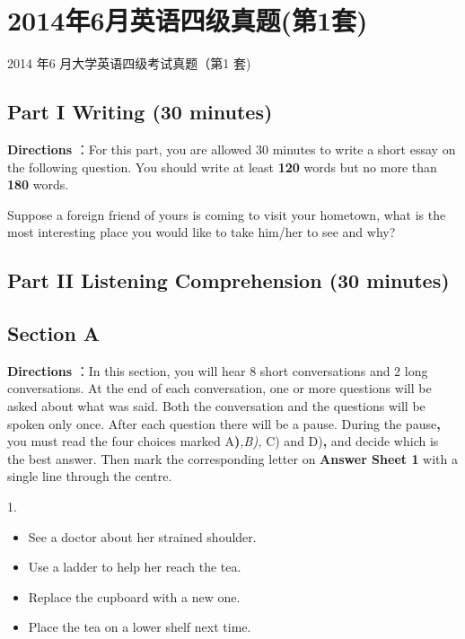 \documentclass[UTF8,11pt]{ctexart}
\begin{document}
\section*{2014年6月英语四级真题(第1套)}
2014 年6 月大学英语四级考试真题（第1 套)


\subsection*{\textbf{Part I} \textbf{Writing} \textbf{(30 minutes)}}


\textbf{Directions} ：For this part, you are allowed 30 minutes to write a short essay on the following question. You should write at least \textbf{120} words but no more than\textbf{ 180} words.


Suppose a foreign friend of yours is coming to visit your hometown, what is the most interesting place you would like to take him/her to see and why?


\subsection*{\textbf{Part II} \textbf{Listening Comprehension} \textbf{(30 minutes)}}


\subsection*{\textbf{Section A}}


\textbf{Directions} ：In this section, you will hear 8 short conversations and 2 long conversations. At the end of each conversation, one or more questions will be asked about what was said. Both the conversation and the questions will be spoken only once. After each question there will be a pause. During the pause\textbf{,} you must read the four choices marked A\textbf{)}\textit{,B),} C) and D)\textbf{,} and decide which is the best answer. Then mark the corresponding letter on\textbf{ Answer Sheet 1} with a single line through the centre.


1.


\begin{itemize}[leftmargin=2em,itemsep=.2em,topsep=.4em]\item[A.] See a doctor about her strained shoulder.
\item[B.] Use a ladder to help her reach the tea.
\item[C.] Replace the cupboard with a new one.
\item[D.] Place the tea on a lower shelf next time.
\end{itemize}
\end{document}
